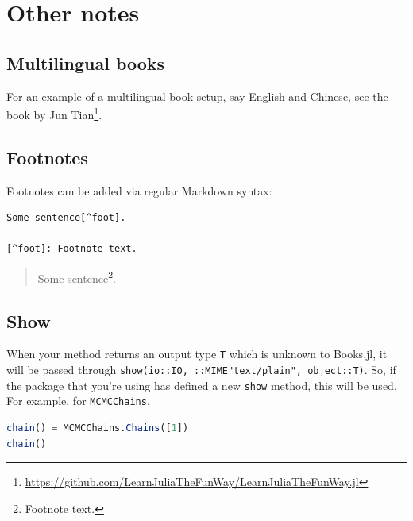 \documentclass[
  notoc %
]{tufte-book}
\DeclareRobustCommand{\href}[2]{#2\footnote{\url{#1}}}
\newcommand{\passthrough}[1]{#1}
\begin{document}
\hypertarget{other-notes}{%
\section{Other notes}\label{other-notes}}

\hypertarget{multilingual-books}{%
\subsection{Multilingual books}\label{multilingual-books}}

For an example of a multilingual book setup, say English and Chinese,
see the book by
\href{https://github.com/LearnJuliaTheFunWay/LearnJuliaTheFunWay.jl}{Jun
Tian}.

\hypertarget{footnotes}{%
\subsection{Footnotes}\label{footnotes}}

Footnotes can be added via regular Markdown syntax:

\begin{lstlisting}
Some sentence[^foot].

[^foot]: Footnote text.
\end{lstlisting}

\begin{quote}
Some sentence\footnote{Footnote text.}.
\end{quote}

\hypertarget{show}{%
\subsection{Show}\label{show}}

When your method returns an output type \passthrough{\lstinline!T!}
which is unknown to Books.jl, it will be passed through
\passthrough{\lstinline!show(io::IO, ::MIME"text/plain", object::T)!}.
So, if the package that you're using has defined a new
\passthrough{\lstinline!show!} method, this will be used. For example,
for \passthrough{\lstinline!MCMCChains!},

\begin{lstlisting}[language=Julia]
chain() = MCMCChains.Chains([1])
chain()
\end{lstlisting}
\end{document}
